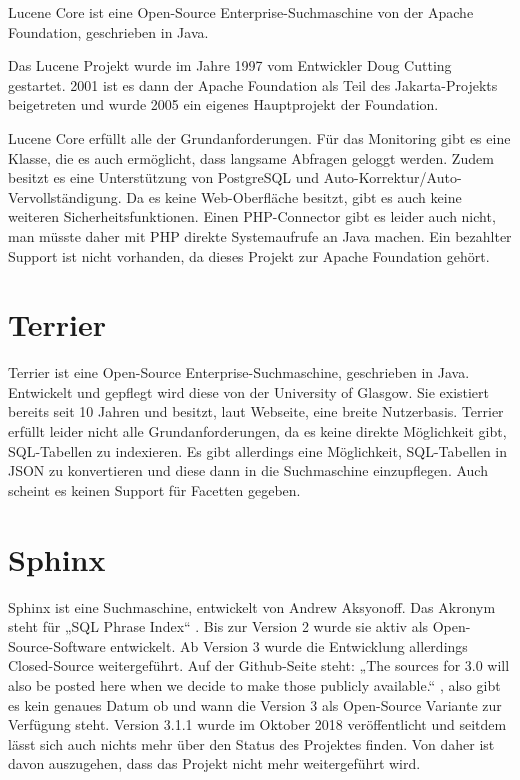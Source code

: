 Lucene Core ist eine Open-Source Enterprise-Suchmaschine von der Apache Foundation, geschrieben in Java.

Das Lucene Projekt wurde im Jahre 1997 vom Entwickler Doug Cutting gestartet. 2001 ist es dann der Apache Foundation als Teil des Jakarta-Projekts beigetreten und wurde 2005 ein eigenes Hauptprojekt der Foundation. \cite{Wikipedia.2019c}

Lucene Core erfüllt alle der Grundanforderungen. Für das Monitoring gibt es eine Klasse, die es auch ermöglicht, dass langsame Abfragen geloggt werden. Zudem besitzt es eine Unterstützung von PostgreSQL und Auto-Korrektur/Auto-Vervollständigung. Da es keine Web-Oberfläche besitzt, gibt es auch keine weiteren Sicherheitsfunktionen. Einen PHP-Connector gibt es leider auch nicht, man müsste daher mit PHP direkte Systemaufrufe an Java machen. Ein bezahlter Support ist nicht vorhanden, da dieses Projekt zur Apache Foundation gehört. \cite{TheApacheSoftwareFoundation.2019b}

\section{Terrier}
\label{terrier}

Terrier ist eine Open-Source Enterprise-Suchmaschine, geschrieben in Java. Entwickelt und gepflegt wird diese von der University of Glasgow. Sie existiert bereits seit 10 Jahren und besitzt, laut Webseite, eine breite Nutzerbasis. 
Terrier erfüllt leider nicht alle Grundanforderungen, da es keine direkte Möglichkeit gibt, SQL-Tabellen zu indexieren. Es gibt allerdings eine Möglichkeit, SQL-Tabellen in JSON zu konvertieren und diese dann in die Suchmaschine einzupflegen. Auch scheint es keinen Support für Facetten gegeben.
\cite{McCreadie.2019}

\section{Sphinx}
\label{sphinx}

Sphinx ist eine Suchmaschine, entwickelt von Andrew Aksyonoff. Das Akronym steht für „SQL Phrase Index“ \cite{SphinxTechnologiesInc.b}. Bis zur Version 2 wurde sie aktiv als Open-Source-Software entwickelt. Ab Version 3 wurde die Entwicklung allerdings Closed-Source weitergeführt. Auf der Github-Seite steht: „The sources for 3.0 will also be posted here when we decide to make those publicly available.“ \cite{sphinxserach.2019}, also gibt es kein genaues Datum ob und wann die Version 3 als Open-Source Variante zur Verfügung steht. Version 3.1.1 wurde im Oktober 2018 veröffentlicht und seitdem lässt sich auch nichts mehr über den Status des Projektes finden. Von daher ist davon auszugehen, dass das Projekt nicht mehr weitergeführt wird. 

